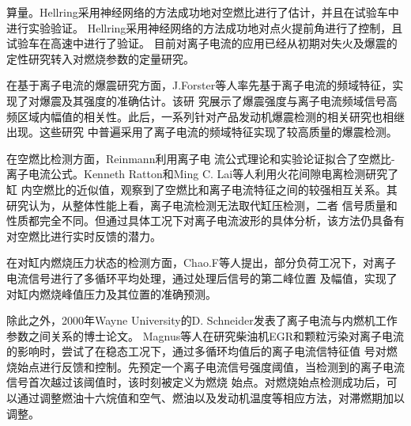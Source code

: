 算量。Hellring\cite{hellring1999robust}采用神经网络的方法成功地对空燃比进行了估计，并且在试验车中进行实验验证。
Hellring\cite{hellring1999spark}采用神经网络的方法成功地对点火提前角进行了控制，且试验车在高速中进行了验证。
目前对离子电流的应用已经从初期对失火及爆震的定性研究转入对燃烧参数的定量研究。\par
在基于离子电流的爆震研究方面，J.Forster等人\cite{forster1999ion}率先基于离子电流的频域特征，实现了对爆震及其强度的准确估计。该研
究展示了爆震强度与离子电流频域信号高频区域内幅值的相关性。此后，一系列针对产品发动机爆震检测的相关研究也相继出现。这些研究
中普遍采用了离子电流的频域特征实现了较高质量的爆震检测。\par
在空燃比检测方面，Reinmann\cite{reinmann1997local}利用离子电
流公式理论和实验论证拟合了空燃比-离子电流公式。Kenneth Ratton和Ming C. Lai等人\cite{balles1998cylinder}利用火花间隙电离检测研究了缸
内空燃比的近似值，观察到了空燃比和离子电流特征之间的较强相互关系。其研究认为，从整体性能上看，离子电流检测无法取代缸压检测，二者
信号质量和性质都完全不同。但通过具体工况下对离子电流波形的具体分析，该方法仍具备有对空燃比进行实时反馈的潜力。\par
在对缸内燃烧压力状态的检测方面，Chao.F等人\cite{zhu2003mbt}提出，部分负荷工况下，对离子电流信号进行了多循环平均处理，通过处理后信号的第二峰位置
及幅值，实现了对缸内燃烧峰值压力及其位置的准确预测。\par
除此之外，2000年Wayne University的D. Schneider\cite{schneider2000experimental}发表了离子电流与内燃机工作参数之间关系的博士论文。
Magnus等人\cite{glavmo1999closed}在研究柴油机EGR和颗粒污染对离子电流的影响时，尝试了在稳态工况下，通过多循环均值后的离子电流信特征值
号对燃烧始点进行反馈和控制。先预定一个离子电流信号强度阈值，当检测到的离子电流信号首次越过该阈值时，该时刻被定义为燃烧
始点。对燃烧始点检测成功后，可以通过调整燃油十六烷值和空气、燃油以及发动机温度等相应方法，对滞燃期加以调整。
